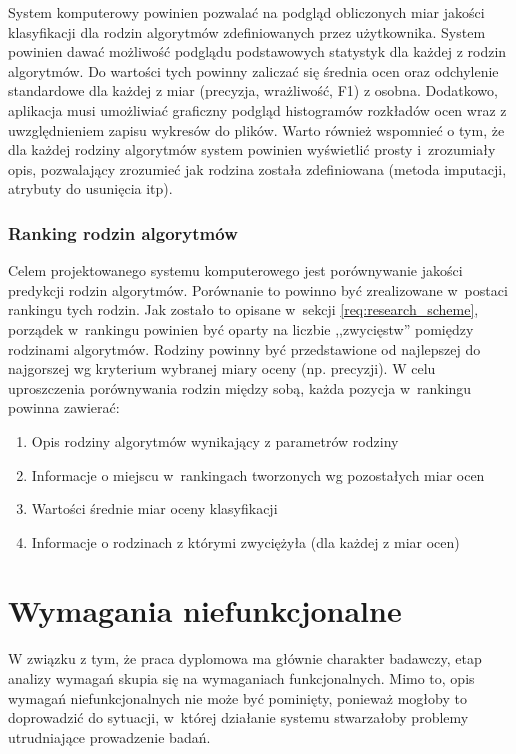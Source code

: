 \documentclass[../thesis.tex]{subfiles}
\begin{document}
System komputerowy powinien pozwalać na podgląd obliczonych miar jakości klasyfikacji dla rodzin algorytmów zdefiniowanych przez użytkownika. System powinien dawać możliwość podglądu podstawowych statystyk dla każdej z rodzin algorytmów. Do wartości tych powinny zaliczać się średnia ocen oraz odchylenie standardowe dla każdej z miar (precyzja, wrażliwość, F1) z osobna. Dodatkowo, aplikacja musi umożliwiać graficzny podgląd histogramów rozkładów ocen wraz z uwzględnieniem zapisu wykresów do plików. Warto również wspomnieć o tym, że dla każdej rodziny algorytmów system powinien wyświetlić prosty i~zrozumiały opis, pozwalający zrozumieć jak rodzina została zdefiniowana (metoda imputacji, atrybuty do usunięcia itp).

\subsubsection{Ranking rodzin algorytmów}

Celem projektowanego systemu komputerowego jest porównywanie jakości predykcji rodzin algorytmów. Porównanie to powinno być zrealizowane w~postaci rankingu tych rodzin. Jak zostało to opisane w~sekcji  \ref{req:research_scheme}, porządek w~rankingu powinien być oparty na liczbie ,,zwycięstw'' pomiędzy rodzinami algorytmów. Rodziny powinny być przedstawione od najlepszej do najgorszej wg kryterium wybranej miary oceny (np. precyzji). W celu uproszczenia porównywania rodzin między sobą, każda pozycja w~rankingu powinna zawierać:
\begin{enumerate}
  \item Opis rodziny algorytmów wynikający z parametrów rodziny
  \item Informacje o miejscu w~rankingach tworzonych wg pozostałych miar ocen
  \item Wartości średnie miar oceny klasyfikacji
  \item Informacje o rodzinach z którymi zwyciężyła (dla każdej z miar ocen)
\end{enumerate}

\section{Wymagania niefunkcjonalne}

W związku z tym, że praca dyplomowa ma głównie charakter badawczy, etap analizy wymagań skupia się na wymaganiach funkcjonalnych. Mimo to, opis wymagań niefunkcjonalnych nie może być pominięty, ponieważ mogłoby to doprowadzić do sytuacji, w~której działanie systemu stwarzałoby problemy utrudniające prowadzenie badań.
\end{document}
